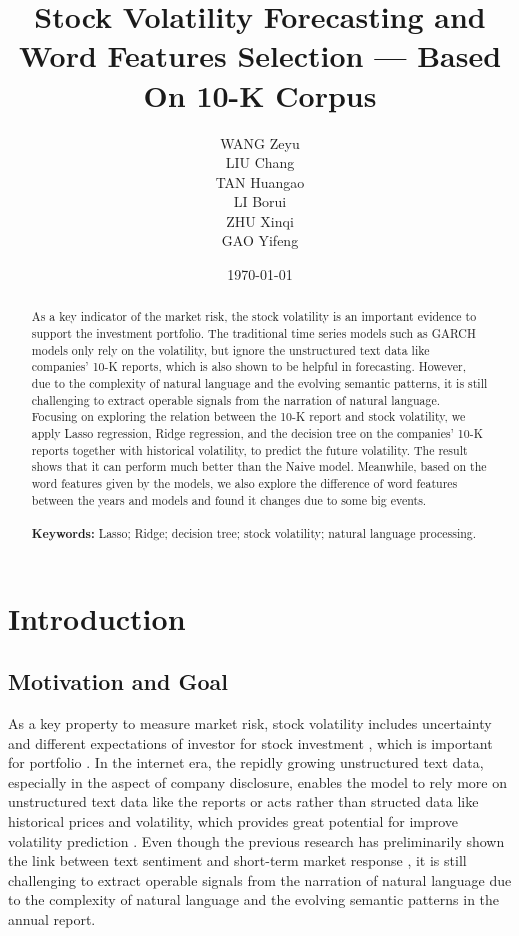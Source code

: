 \documentclass[11pt]{article}
\title{\vspace{-1.5cm} \huge Stock Volatility Forecasting and Word Features Selection --- Based On 10-K Corpus}
\author{
  \parbox{0.3\textwidth}{
    \centering WANG Zeyu
    \vspace{.25cm}
  }
  \parbox{0.3\textwidth}{
    \centering LIU Chang
    \vspace{.25cm}
  }
  \parbox{0.3\textwidth}{
    \centering TAN Huangao
    \vspace{.25cm}
  }
  \parbox{0.3\textwidth}{
    \centering LI Borui
  }
  \parbox{0.3\textwidth}{
    \centering ZHU Xinqi
  }
  \parbox{0.3\textwidth}{
    \centering GAO Yifeng
  }
}
\date{\today}
\begin{document}
\maketitle
\thispagestyle{empty}
\setcounter{page}{0}

\begin{abstract}
  As a key indicator of the market risk, the stock volatility is an important evidence to support the investment portfolio. The traditional time series models such as GARCH models only rely on the volatility, but ignore the unstructured text data like companies' 10-K reports, which is also shown to be helpful in forecasting. However, due to the complexity of natural language and the evolving semantic patterns, it is still challenging to extract operable signals from the narration of natural language. Focusing on exploring the relation between the 10-K report and stock volatility, we apply Lasso regression, Ridge regression, and the decision tree on the companies' 10-K reports together with historical volatility, to predict the future volatility. The result shows that it can perform much better than the Naive model. Meanwhile, based on the word features given by the models, we also explore the difference of word features between the years and models and found it changes due to some big events.
  \\\\
  \textbf{Keywords:} Lasso; Ridge; decision tree; stock volatility; natural language processing.
\end{abstract}

\newpage

\section{Introduction}

\subsection{Motivation and Goal}

As a key property to measure market risk, stock volatility includes uncertainty and different expectations of investor for stock investment \cite{RePEc:eee:finlet:v:69:y:2024:i:pb:s1544612324011929}, which is important for portfolio \cite{ta2020portfolio}. In the internet era, the repidly growing unstructured text data, especially in the aspect of company disclosure, enables the model to rely more on unstructured text data like the reports or acts \cite{RAJENDRAN2024101813} rather than structed data like historical prices and volatility, which provides great potential for improve volatility prediction \cite{Ma2024} . Even though the previous research has preliminarily shown the link between text sentiment and short-term market response \cite{li2022sentiment}, it is still challenging to extract operable signals from the narration of natural language due to the complexity of natural language and the evolving semantic patterns in the annual report.
\end{document}
